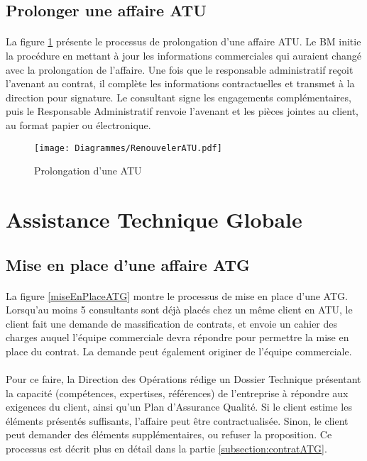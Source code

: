 \subsection{Prolonger une affaire ATU}

\paragraph{} La figure \ref{prolongerATU} présente le processus de prolongation d'une affaire ATU. Le BM initie la procédure en mettant à jour les informations commerciales qui auraient changé avec la prolongation de l'affaire. Une fois que le responsable administratif reçoit l'avenant au contrat, il complète les informations contractuelles et transmet à la direction pour signature. Le consultant signe les engagements complémentaires, puis le Responsable Administratif renvoie l'avenant et les pièces jointes au client, au format papier ou électronique.

\begin{figure}[H]
	\centering
	\texttt{[image: Diagrammes/RenouvelerATU.pdf]}
	\caption{Prolongation d'une ATU} 
	\label{prolongerATU}
\end{figure}

\newpage

\section{Assistance Technique Globale}

\subsection{Mise en place d'une affaire ATG}

 \paragraph{} La figure \ref{miseEnPlaceATG} montre le processus de mise en place d'une ATG. Lorsqu'au moins 5 consultants sont déjà placés chez un même client en ATU, le client fait une demande de massification de contrats, et envoie un cahier des charges auquel l'équipe commerciale devra répondre pour permettre la mise en place du contrat. La demande peut également originer de l'équipe commerciale.
 \paragraph{} Pour ce faire, la Direction des Opérations rédige un Dossier Technique présentant la capacité (compétences, expertises, références) de l'entreprise à répondre aux exigences du client, ainsi qu'un Plan d'Assurance Qualité. Si le client estime les éléments présentés suffisants, l'affaire peut être contractualisée. Sinon, le client peut demander des éléments supplémentaires, ou refuser la proposition. Ce processus est décrit plus en détail dans la partie \ref{subsection:contratATG}.

